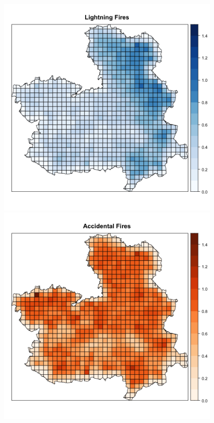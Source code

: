 \begin{figure}[h!]
\begin{center}
\includegraphics[scale=0.40]{images/CLMFires_lightning.png}
\includegraphics[scale=0.40]{images/CLMFires_accidental.png}

\end{center}
\end{figure}

